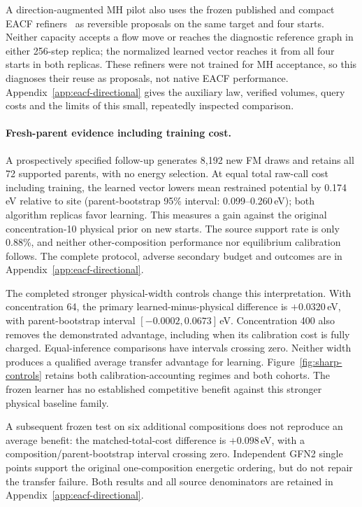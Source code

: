 A direction-augmented MH pilot also uses the frozen published and compact EACF
refiners~\citep{midgley2023eacf} as reversible proposals on the same target and
four starts. Neither capacity accepts a flow move or reaches the diagnostic
reference graph in either 256-step replica; the normalized learned vector reaches
it from all four starts in both replicas. These refiners were not trained for MH
acceptance, so this diagnoses their reuse as proposals, not native EACF performance.
Appendix~\ref{app:eacf-directional} gives the auxiliary law, verified volumes,
query costs and the limits of this small, repeatedly inspected comparison.

\paragraph{Fresh-parent evidence including training cost.}
A prospectively specified follow-up generates 8,192 new FM draws and retains
all 72 supported parents, with no energy selection. At equal total raw-call
cost including training, the learned vector lowers mean restrained potential
by 0.174\,eV relative to site (parent-bootstrap 95\% interval: 0.099--0.260\,eV);
both algorithm replicas favor learning. This measures a gain against the original
concentration-10 physical prior on new starts. The source support rate is only 0.88\%,
and neither other-composition performance nor equilibrium calibration follows.
The complete protocol, adverse secondary budget and outcomes are in
Appendix~\ref{app:eacf-directional}.

The completed stronger physical-width controls change this interpretation.
With concentration 64, the primary learned-minus-physical difference is
$+0.0320$\,eV, with parent-bootstrap interval $[-0.0002,0.0673]$\,eV.
Concentration 400 also removes the demonstrated advantage, including when its
calibration cost is fully charged. Equal-inference comparisons have intervals
crossing zero. Neither width produces a qualified average transfer advantage for
learning. Figure~\ref{fig:sharp-controls} retains both calibration-accounting
regimes and both cohorts. The frozen learner has no established competitive
benefit against this stronger physical baseline family.

A subsequent frozen test on six additional compositions does not reproduce an
average benefit: the matched-total-cost difference is $+0.098$\,eV, with a
composition/parent-bootstrap interval crossing zero. Independent GFN2 single
points support the original one-composition energetic ordering, but do not repair
the transfer failure. Both results and all source denominators are retained in
Appendix~\ref{app:eacf-directional}.

